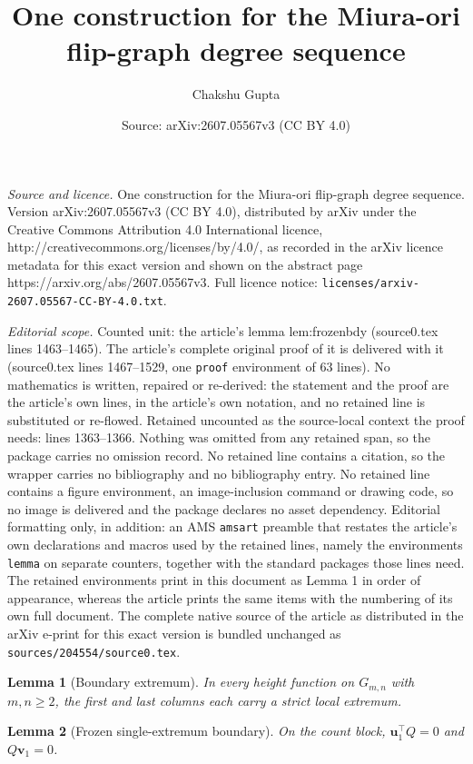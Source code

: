 \documentclass[10pt,a4paper]{amsart}
\title{One construction for the Miura-ori flip-graph degree sequence}
\author{Chakshu Gupta}
\date{Source: arXiv:2607.05567v3 (CC BY 4.0)}
\newtheorem{lemma}{Lemma}
\newcommand{\Gmn}{G_{m,n}}
\begin{document}
\maketitle

\noindent\emph{Source and licence.} One construction for the Miura-ori flip-graph degree sequence. Version arXiv:2607.05567v3 (CC BY 4.0), distributed by arXiv under the Creative Commons Attribution 4.0 International licence, http://creativecommons.org/licenses/by/4.0/, as recorded in the arXiv licence metadata for this exact version and shown on the abstract page https://arxiv.org/abs/2607.05567v3. Full licence notice: \texttt{licenses/arxiv-2607.05567-CC-BY-4.0.txt}.\par\smallskip

\noindent\textit{Editorial scope.} Counted unit: the article's lemma lem:frozenbdy (source0.tex lines 1463--1465). The article's complete original proof of it is delivered with it (source0.tex lines 1467--1529, one \texttt{proof} environment of 63 lines). No mathematics is written, repaired or re-derived: the statement and the proof are the article's own lines, in the article's own notation, and no retained line is substituted or re-flowed.  Retained uncounted as the source-local context the proof needs: lines 1363--1366.  Nothing was omitted from any retained span, so the package carries no omission record.  No retained line contains a citation, so the wrapper carries no bibliography and no bibliography entry.  No retained line contains a figure environment, an image-inclusion command or drawing code, so no image is delivered and the package declares no asset dependency.  Editorial formatting only, in addition: an AMS \texttt{amsart} preamble that restates the article's own declarations and macros used by the retained lines, namely the environments \texttt{lemma} on separate counters, together with the standard packages those lines need.  The retained environments print in this document as Lemma 1 in order of appearance, whereas the article prints the same items with the numbering of its own full document.  The complete native source of the article as distributed in the arXiv e-print for this exact version is bundled unchanged as \texttt{sources/204554/source0.tex}.
\begin{lemma}[Boundary extremum]\label{lem:boundary}
In every height function on $\Gmn$ with $m,n\ge2$, the first and last columns each
carry a strict local extremum.
\end{lemma}

\begin{lemma}[Frozen single-extremum boundary]\label{lem:frozenbdy}
On the count block, $\mathbf u_1^{\!\top}Q=0$ and $Q\mathbf v_1=0$.
\end{lemma}
\end{document}
